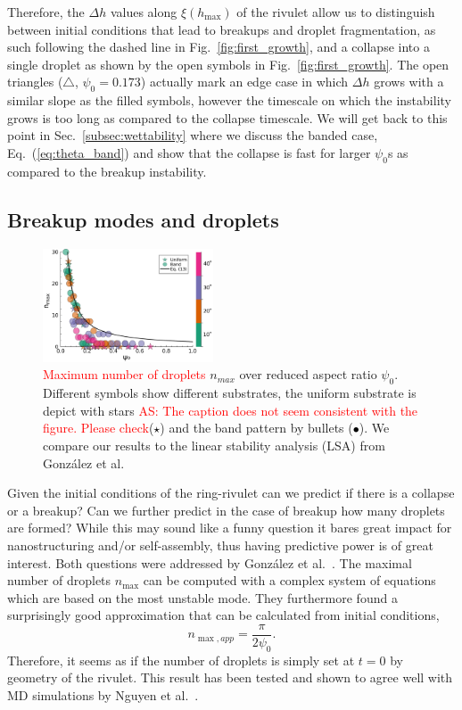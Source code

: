 \documentclass[twoside,twocolumn,9pt]{article}
\begin{document}
Therefore, the $\Delta h$ values along $\xi(h_{\max})$ of the rivulet allow us to distinguish between initial conditions that lead to breakups and droplet fragmentation, as such following the dashed line in Fig.~\ref{fig:first_growth}, and a collapse into a single droplet as shown by the open symbols in Fig.~\ref{fig:first_growth}.
The open triangles ($\triangle$, $\psi_0 = 0.173$) actually mark an edge case in which $\Delta h$ grows with a similar slope as the filled symbols, however the timescale on which the instability grows is too long as compared to the collapse timescale. 
We will get back to this point in Sec.~\ref{subsec:wettability} where we discuss the banded case, Eq.~(\ref{eq:theta_band}) and show that the collapse is fast for larger $\psi_0$s as compared to the breakup instability.

\subsection{Breakup modes and droplets}\label{subsec:drop-counting}
\begin{figure}
    \centering
    \includegraphics[width=0.45\textwidth]{assets/maxdropsUniBandCC.pdf}
    \caption{\textcolor{red}{Maximum number of droplets} $n_{max}$ over reduced aspect ratio $\psi_0$.
    Different symbols show different substrates, the uniform substrate is depict with stars 
    \textcolor{red}{AS: The caption does not seem consistent with the figure. Please check}(\textcolor{black}{$\star$}) and the band pattern by bullets (\textcolor{black}{$\bullet$}).
    We compare our results to the linear stability analysis (LSA) from Gonz{\'a}lez et al.~\cite{gonzalezStabilityLiquidRing2013}}
    \label{fig:max_drops}
\end{figure}

Given the initial conditions of the ring-rivulet can we predict if there is a collapse or a breakup? 
Can we further predict in the case of breakup how many droplets are formed?
While this may sound like a funny question it bares great impact for nanostructuring and/or self-assembly, thus having predictive power is of great interest.
Both questions were addressed by Gonz{\'a}lez et al.~\cite{gonzalezStabilityLiquidRing2013}. 
The maximal number of droplets $n_{\max}$ can be computed with a complex system of equations which are based on the most unstable mode.
They furthermore found a surprisingly good approximation that can be calculated from initial conditions, 
\begin{equation}\label{eq:maxDrops}
    n_{\max, app} = \frac{\pi}{2\psi_0}.
\end{equation}
Therefore, it seems as if the number of droplets is simply set at $t=0$ by geometry of the rivulet.
This result has been tested and shown to agree well with MD simulations by Nguyen et al.~\cite{nguyenCompetitionCollapseBreakup2012}. 
\end{document}
